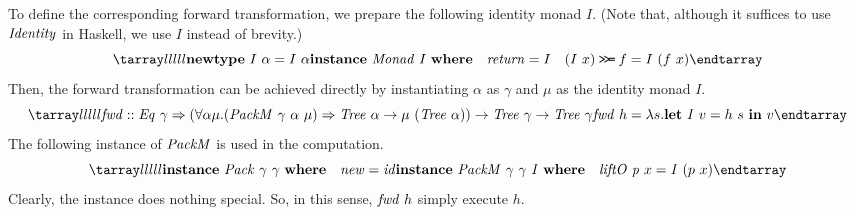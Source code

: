 \documentclass{article}
\theoremstyle{definition}
\newcommand{\BIND}{\mathbin{\texttt{>\!>\!=}}}
\newcommand{\texteq}{\mathrel{\texttt{==}}}
\begin{document}
To define the corresponding forward transformation, we prepare the following identity monad $I$. (Note that, although it suffices to use $\mathit{Identity}$ in Haskell, we use $I$ instead of brevity.)
\[
\bb
 \key{newtype}~I~\alpha = I~\alpha\\
 \key{instance}~\mi{Monad}~I~\key{where} \\
 \quad \mi{return} = I \\
 \quad (I~x) \BIND f = I~(f~x) 
\ee
\]
Then, the forward transformation can be achieved directly by instantiating $\alpha$ as $\gamma$ and $\mu$ as the identity monad $I$.
\[
\]
\[
\bb
\mi{fwd} :: \mi{Eq}~\gamma \Rightarrow (
 \forall \alpha \mu. (\mi{PackM}~\gamma~\alpha~\mu) \Rightarrow 
 \mi{Tree}~\alpha \to \mu~(\mi{Tree}~\alpha))
 \to \mi{Tree}~\gamma \to \mi{Tree}~\gamma\\
\mi{fwd}~h = \lambda s. 
    \key{let}~\mi{I}~v = h~s~\key{in}~v 
\ee
\]
The following instance of $\mathit{PackM}$ is used in the computation.
\[
\bb
 \key{instance}~\mi{Pack}~\gamma~\gamma~\key{where} \\
 \quad \mi{new} = \mi{id} \\
 \key{instance}~\mi{PackM}~\gamma~\gamma~\mi{I}~\key{where}\\
 \quad \mi{liftO}~\mi{p}~x = \mi{I}~(p~x) 
\ee 
\]
Clearly, the instance does nothing special. So, in this sense,
$\mathit{fwd}~h$ simply execute $h$.



\end{document}
